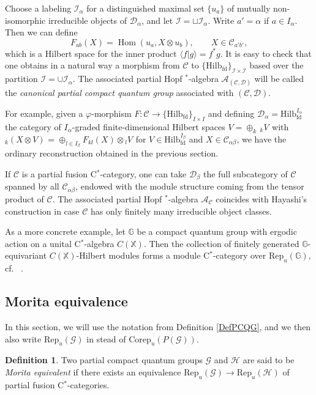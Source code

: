 \documentclass[10pt]{article}
\DeclareMathOperator{\fin}{\mathrm{fd}}
\DeclareMathOperator{\Hom}{Hom}
\newcommand{\Corep}{\mathrm{Corep}}
\newcommand{\G}{\mathbb{G}}
\newcommand{\CatC}{\mathcal{C}}
\newcommand{\CatD}{\mathcal{D}}
\newcommand{\CatCC}{\mathscr{C}}
\newcommand{\CatDD}{\mathscr{D}}
\newcommand{\Hilb}{\mathrm{Hilb}}
\newcommand{\Rep}{\mathrm{Rep}}
\newcommand{\GrDA}[3]{{}_{#2}#1_{#3}} %
\theoremstyle{definition}
\newtheorem{Def}[Theorem]{Definition}
\numberwithin{equation}{section}
\begin{document}
Choose a labeling $\mathcal{I}_{\alpha}$ for a distinguished maximal set $\{u_a\}$ of mutually non-isomorphic irreducible objects of $\CatD_{\alpha}$, and let $\mathcal{I} = \sqcup \mathcal{I}_{\alpha}$. Write $a' = \alpha$ if $a\in I_{\alpha}$. Then we can define \[F_{ab}(X)  = \Hom(u_a,  X\otimes u_b),\qquad X\in \CatC_{a'b'},\] which is a Hilbert space for the inner product $\langle f| g \rangle = f^*g$. It is easy to check that one obtains in a natural way a morphism from $\CatCC$ to $\{\Hilb_{\fin}\}_{\mathcal{I}\times \mathcal{I}}$ based over the partition $\mathcal{I} = \cup \mathcal{I}_{\alpha}$. The associated partial Hopf $^*$-algebra $\mathscr{A}_{(\CatCC,\CatDD)}$ will be called the \emph{canonical partial compact quantum group} associated with $(\CatCC,\CatDD)$. 

For example, given a $\varphi$-morphism $F:\CatCC \rightarrow  \{\Hilb_{\fin}\}_{I\times I}$ and defining $\CatDD_{\alpha} =\Hilb_{\fin}^{I_{\alpha}}$ the category of $I_{\alpha}$-graded finite-dimensional Hilbert spaces $V = \oplus_k\, \GrDA{V}{k}{}$ with $\GrDA{\left(X\otimes V\right)}{k}{} = \oplus_{l\in I_{\beta}} F_{kl}(X)\otimes \GrDA{V}{l}{}$ for $V\in \Hilb_{\fin}^{I_{\beta}}$ and $X\in \CatC_{\alpha\beta}$, we have the ordinary reconstruction obtained in the previous section. 

If $\CatCC$ is a partial fusion C$^*$-category, one can take $\CatD_{\beta}$ the full subcategory of $\CatC$ spanned by all $\CatC_{\alpha\beta}$, endowed with the module structure coming from the tensor product of $\CatCC$. The associated partial Hopf $^*$-algebra $\mathscr{A}_{\CatCC}$ coincides with Hayashi's construction \cite{Hay8} in case $\CatCC$ has only finitely many irreducible object classes. 

As a more concrete example, let $\G$ be a compact quantum group with ergodic action on a unital C$^*$-algebra $C(\mathbb{X})$. Then the collection of finitely generated $\G$-equivariant $C(\mathbb{X})$-Hilbert modules forms a module C$^*$-category over $\Rep_u(\G)$, cf.~ \cite{DCY1}. 

\subsection{Morita equivalence}

In this section, we will use the notation from Definition \ref{DefPCQG}, and we then also write $\Rep_u(\mathscr{G})$ in stead of $\Corep_u(P(\mathscr{G}))$.


\begin{Def} Two partial compact quantum groups $\mathscr{G}$ and $\mathscr{H}$ are said to be \emph{Morita equivalent} if there exists an equivalence $\Rep_u(\mathscr{G}) \rightarrow \Rep_u(\mathscr{H})$ of partial fusion C$^*$-categories. 
\end{Def} 
\end{document}
